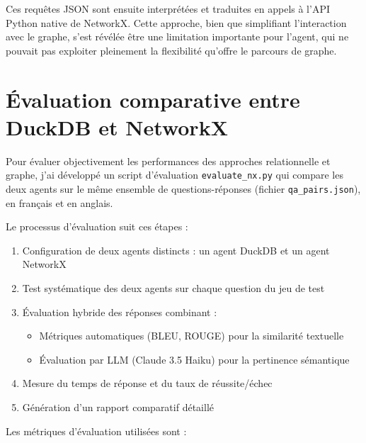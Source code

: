 \documentclass[a4paper,11pt]{article}
\begin{document}
Ces requêtes JSON sont ensuite interprétées et traduites en appels à l'API Python native de NetworkX. Cette approche, bien que simplifiant l'interaction avec le graphe, s'est révélée être une limitation importante pour l'agent, qui ne pouvait pas exploiter pleinement la flexibilité qu'offre le parcours de graphe.


\section{Évaluation comparative entre DuckDB et NetworkX}
\label{sec:evaluation}

Pour évaluer objectivement les performances des approches relationnelle et graphe, j'ai développé un script d'évaluation \texttt{evaluate\_nx.py} qui compare les deux agents sur le même ensemble de questions-réponses (fichier \texttt{qa\_pairs.json}), en français et en anglais.

Le processus d'évaluation suit ces étapes :

\begin{enumerate}
    \item Configuration de deux agents distincts : un agent DuckDB et un agent NetworkX
    \item Test systématique des deux agents sur chaque question du jeu de test
    \item Évaluation hybride des réponses combinant :
    \begin{itemize}
        \item Métriques automatiques (BLEU, ROUGE) pour la similarité textuelle
        \item Évaluation par LLM (Claude 3.5 Haiku) pour la pertinence sémantique
    \end{itemize}
    \item Mesure du temps de réponse et du taux de réussite/échec
    \item Génération d'un rapport comparatif détaillé
\end{enumerate}

Les métriques d'évaluation utilisées sont :
\end{document}
